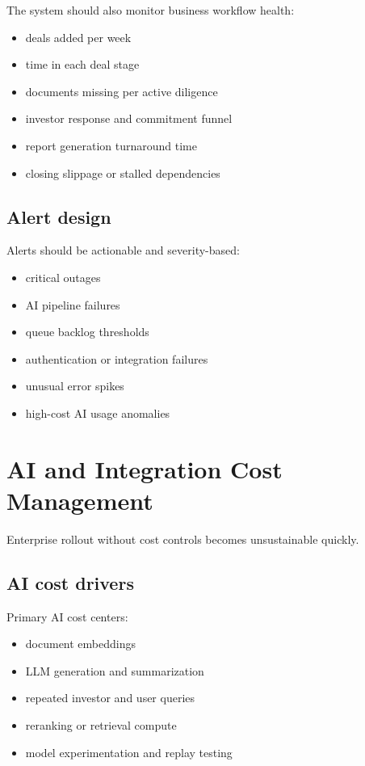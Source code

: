 \documentclass[11pt]{article}
\begin{document}
The system should also monitor business workflow health:

\begin{itemize}
\item deals added per week
\item time in each deal stage
\item documents missing per active diligence
\item investor response and commitment funnel
\item report generation turnaround time
\item closing slippage or stalled dependencies
\end{itemize}

\subsection{Alert design}

Alerts should be actionable and severity-based:

\begin{itemize}
\item critical outages
\item AI pipeline failures
\item queue backlog thresholds
\item authentication or integration failures
\item unusual error spikes
\item high-cost AI usage anomalies
\end{itemize}

\section{AI and Integration Cost Management}

Enterprise rollout without cost controls becomes unsustainable quickly.

\subsection{AI cost drivers}

Primary AI cost centers:

\begin{itemize}
\item document embeddings
\item LLM generation and summarization
\item repeated investor and user queries
\item reranking or retrieval compute
\item model experimentation and replay testing
\end{itemize}
\end{document}

